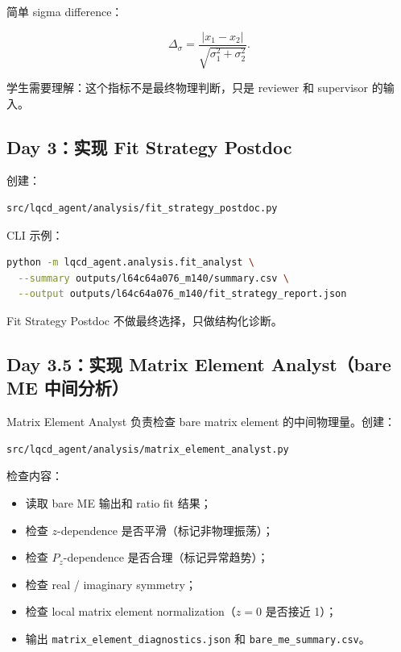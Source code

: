 \documentclass[11pt,a4paper,fontset=none]{ctexart}
\begin{document}
简单 sigma difference：

\begin{equation}
\Delta_\sigma = \frac{|x_1-x_2|}{\sqrt{\sigma_1^2+\sigma_2^2}}.
\end{equation}

学生需要理解：这个指标不是最终物理判断，只是 reviewer 和 supervisor 的输入。

\subsection{Day 3：实现 Fit Strategy Postdoc}

创建：

\begin{lstlisting}
src/lqcd_agent/analysis/fit_strategy_postdoc.py
\end{lstlisting}

CLI 示例：

\begin{lstlisting}[language=bash]
python -m lqcd_agent.analysis.fit_analyst \
  --summary outputs/l64c64a076_m140/summary.csv \
  --output outputs/l64c64a076_m140/fit_strategy_report.json
\end{lstlisting}

Fit Strategy Postdoc 不做最终选择，只做结构化诊断。

\subsection{Day 3.5：实现 Matrix Element Analyst（bare ME 中间分析）}

Matrix Element Analyst 负责检查 bare matrix element 的中间物理量。创建：
\begin{lstlisting}
src/lqcd_agent/analysis/matrix_element_analyst.py
\end{lstlisting}

检查内容：
\begin{itemize}[leftmargin=2em]
  \item 读取 bare ME 输出和 ratio fit 结果；
  \item 检查 $z$-dependence 是否平滑（标记非物理振荡）；
  \item 检查 $P_z$-dependence 是否合理（标记异常趋势）；
  \item 检查 real / imaginary symmetry；
  \item 检查 local matrix element normalization（$z=0$ 是否接近 1）；
  \item 输出 \texttt{matrix\_element\_diagnostics.json} 和 \texttt{bare\_me\_summary.csv}。
\end{itemize}
\end{document}
